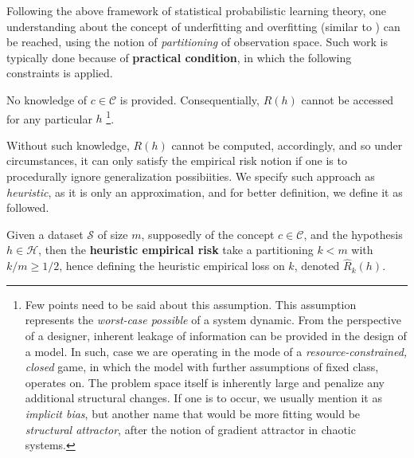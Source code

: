 Following the above framework of statistical probabilistic learning theory, one understanding about the concept of underfitting and overfitting (similar to \cite{James2021}) can be reached, using the notion of \textit{partitioning} of observation space. Such work is typically done because of \textbf{practical condition}, in which the following constraints is applied.
\begin{assumption}\label{assume:cpi_transparency}
    No knowledge of $c\in\mathcal{C}$ is provided. Consequentially, $R(h)$ cannot be accessed for any particular $h$ \footnote{Few points need to be said about this assumption. This assumption represents the \textit{worst-case possible} of a system dynamic. From the perspective of a designer, inherent leakage of information can be provided in the design of a model. In such, case we are operating in the mode of a \textit{resource-constrained, closed} game, in which the model with further assumptions of fixed class, operates on. The problem space itself is inherently large and penalize any additional structural changes. If one is to occur, we usually mention it as \textit{implicit bias}, but another name that would be more fitting would be \textit{structural attractor}, after the notion of gradient attractor in chaotic systems.}.
\end{assumption}

Without such knowledge, $R(h)$ cannot be computed, accordingly, and so under circumstances, it can only satisfy the empirical risk notion if one is to procedurally ignore generalization possibiities. We specify such approach as \textit{heuristic}, as it is only an approximation, and for better definition, we define it as followed. 

\begin{definition}
  Given a dataset $\mathcal{S}$ of size $m$, supposedly of the concept $c\in \mathcal{C}$, and the hypothesis $h\in \mathcal{H}$, then the \textbf{heuristic empirical risk} take a partitioning $k<m$ with $k/m\geq 1/2$, hence defining the heuristic empirical loss on $k$, denoted $\hat{R}_{k}(h)$. 
\end{definition}

